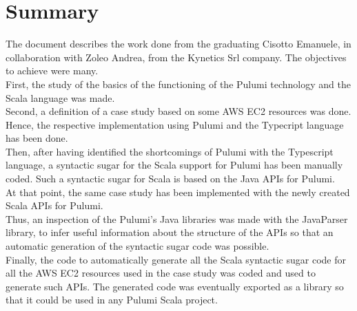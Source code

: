 
{}
{}
\begingroup
\let\clearpage\relax
\let\cleardoublepage\relax
\let\cleardoublepage\relax

\chapter*{Summary}

The document describes the work done from the graduating Cisotto Emanuele, in collaboration with Zoleo Andrea, from the Kynetics Srl company.
The objectives to achieve were many.\\
First, the study of the basics of the functioning of the Pulumi technology and the Scala language was made.\\
Second, a definition of a case study based on some \gls{AWS} \gls{EC2} resources was done. Hence, the respective implementation using Pulumi and the Typecript language has been done.\\
Then, after having identified the shortcomings of Pulumi with the Typescript language, a syntactic sugar for the Scala support for Pulumi has been manually coded.
Such a syntactic sugar for Scala is based on the Java APIs for Pulumi.\\
At that point, the same case study has been implemented with the newly created Scala APIs for Pulumi.\\
Thus, an inspection of the Pulumi's Java libraries was made with the \gls{JavaParser} library, to infer useful information about the structure of the APIs so that an automatic generation of the syntactic sugar code was possible.\\
Finally, the code to automatically generate all the Scala syntactic sugar code for all the AWS EC2 resources used in the case study was coded and used to generate such APIs.
The generated code was eventually exported as a library so that it could be used in any Pulumi Scala project.




%
%

\endgroup			

\vfill

